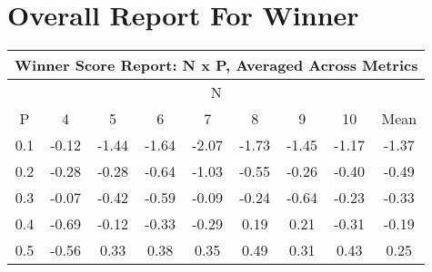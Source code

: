 \documentclass[11pt,a4paper]{report}
\begin{document}
\chapter{Overall Report For Winner}
\begin{longtable}{ | c || c | c | c | c | c | c | c || c |}
\hline
\multicolumn{9}{|c|}{ Winner Score Report: N x P, Averaged Across Metrics } \\
\hline
\multicolumn{9}{|c|}{ N } \\
\hline
P & 4 & 5 & 6 & 7 & 8 & 9 & 10 & Mean\\
\hline
\hline
\endhead
0.1 &  \cellcolor[HTML]{FFFFFF} -0.12 &  \cellcolor[HTML]{FFD7D7} -1.44 &  \cellcolor[HTML]{FFD7D7} -1.64 &  \cellcolor[HTML]{FFC7C7} -2.07 &  \cellcolor[HTML]{FFD7D7} -1.73 &  \cellcolor[HTML]{FFD7D7} -1.45 &  \cellcolor[HTML]{FFDFDF} -1.17 &  \cellcolor[HTML]{FFDFDF} -1.37 \\
0.2 &  \cellcolor[HTML]{FFF7F7} -0.28 &  \cellcolor[HTML]{FFF7F7} -0.28 &  \cellcolor[HTML]{FFEFEF} -0.64 &  \cellcolor[HTML]{FFE7E7} -1.03 &  \cellcolor[HTML]{FFEFEF} -0.55 &  \cellcolor[HTML]{FFF7F7} -0.26 &  \cellcolor[HTML]{FFF7F7} -0.40 &  \cellcolor[HTML]{FFEFEF} -0.49 \\
0.3 &  \cellcolor[HTML]{FFFFFF} -0.07 &  \cellcolor[HTML]{FFF7F7} -0.42 &  \cellcolor[HTML]{FFEFEF} -0.59 &  \cellcolor[HTML]{FFFFFF} -0.09 &  \cellcolor[HTML]{FFF7F7} -0.24 &  \cellcolor[HTML]{FFEFEF} -0.64 &  \cellcolor[HTML]{FFF7F7} -0.23 &  \cellcolor[HTML]{FFF7F7} -0.33 \\
0.4 &  \cellcolor[HTML]{FFEFEF} -0.69 &  \cellcolor[HTML]{FFFFFF} -0.12 &  \cellcolor[HTML]{FFF7F7} -0.33 &  \cellcolor[HTML]{FFF7F7} -0.29 &  \cellcolor[HTML]{F7F7FF} 0.19 &  \cellcolor[HTML]{F7F7FF} 0.21 &  \cellcolor[HTML]{FFF7F7} -0.31 &  \cellcolor[HTML]{FFF7F7} -0.19 \\
0.5 &  \cellcolor[HTML]{FFEFEF} -0.56 &  \cellcolor[HTML]{F7F7FF} 0.33 &  \cellcolor[HTML]{F7F7FF} 0.38 &  \cellcolor[HTML]{F7F7FF} 0.35 &  \cellcolor[HTML]{EFEFFF} 0.49 &  \cellcolor[HTML]{F7F7FF} 0.31 &  \cellcolor[HTML]{F7F7FF} 0.43 &  \cellcolor[HTML]{F7F7FF} 0.25 \\

\end{longtable}
\end{document}
